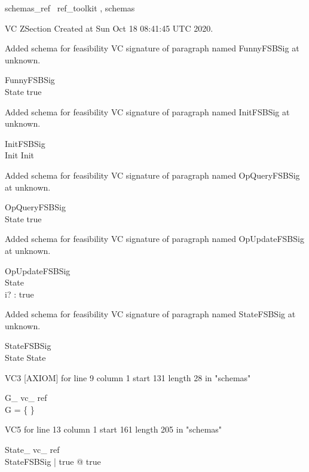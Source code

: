 \documentclass{article}
\begin{document}

\begin{zsection}	 \SECTION schemas\_ref \parents~ref\_toolkit , schemas
\end{zsection}

VC ZSection Created at Sun Oct 18 08:41:45 UTC 2020.


Added schema for feasibility VC signature of paragraph named FunnyFSBSig at unknown.
\begin{schema}{FunnyFSBSig}
\\
 State 
\where
 true
\end{schema}


Added schema for feasibility VC signature of paragraph named InitFSBSig at unknown.
\begin{schema}{InitFSBSig}
\\
 Init 
\where
 Init
\end{schema}


Added schema for feasibility VC signature of paragraph named OpQueryFSBSig at unknown.
\begin{schema}{OpQueryFSBSig}
\\
 State 
\where
 true
\end{schema}


Added schema for feasibility VC signature of paragraph named OpUpdateFSBSig at unknown.
\begin{schema}{OpUpdateFSBSig}
\\
 State \\
 i? : \nat 
\where
 true
\end{schema}


Added schema for feasibility VC signature of paragraph named StateFSBSig at unknown.
\begin{schema}{StateFSBSig}
\\
 State 
\where
 State
\end{schema}

VC3 [AXIOM] for line 9 column 1 start 131 length 28 in "schemas"
\begin{theorem}{ G\_ vc\_ ref}\\
 \lnot G = \{ \} \\

\end{theorem}

VC5 for line 13 column 1 start 161 length 205 in "schemas"
\begin{theorem}{ State\_ vc\_ ref}\\
 \exists StateFSBSig | true @ true \\

\end{theorem}
\end{document}
